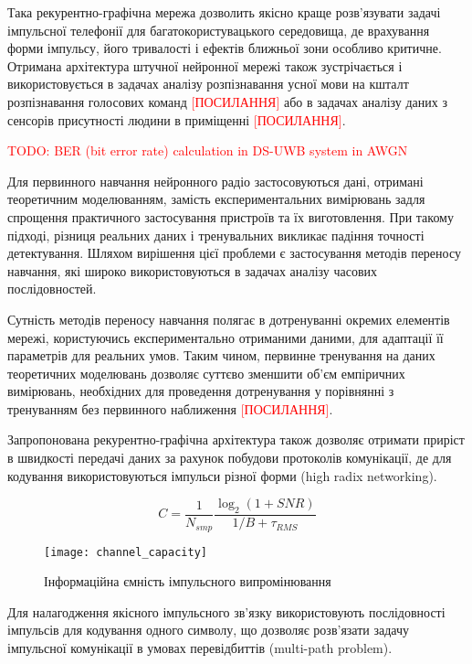 Така рекурентно-графічна мережа дозволить якісно краще розв'язувати задачі 
імпульсної телефонії для багатокористувацького середовища, де врахування форми 
імпульсу, його тривалості і ефектів ближньої зони особливо критичне. Отримана 
архітектура штучної нейронної мережі також зустрічається і використовується в 
задачах аналізу розпізнавання усної мови на кшталт розпізнавання голосових 
команд \textcolor{red}{[ПОСИЛАННЯ]} або в задачах аналізу даних з сенсорів
присутності людини в приміщенні \textcolor{red}{[ПОСИЛАННЯ]}. 

\textcolor{red}{TODO: BER (bit error rate) calculation in DS-UWB system in AWGN}

Для первинного навчання нейронного радіо застосовуються дані, отримані 
теоретичним моделюванням, замість експериментальних вимірювань задля спрощення 
практичного застосування пристроїв та їх виготовлення. При такому підході,
різниця реальних даних і тренувальних викликає падіння точності детектування.
Шляхом вирішення цієї проблеми є застосування методів переносу навчання, які 
широко використовуються в задачах аналізу часових послідовностей. 

Сутність методів переносу навчання полягає в дотренуванні окремих елементів 
мережі, користуючись експериментально отриманими даними, для адаптації її 
параметрів для реальних умов. Таким чином, первинне тренування на даних
теоретичних моделювань дозволяє суттєво зменшити об'єм емпіричних вимірювань,
необхідних для проведення дотренування у порівнянні з тренуванням без 
первинного наближення \textcolor{red}{[ПОСИЛАННЯ]}.

Запропонована рекурентно-графічна архітектура також дозволяє отримати приріст 
в швидкості передачі даних за рахунок побудови протоколів комунікації, де для
кодування використовуються імпульси різної форми (high radix networking).

\begin{equation}
C = \frac{1}{N_{smp}} \frac{\log_2 \left( 1 + SNR \right)}{1/B + \tau_{RMS}} 
\end{equation}

\begin{figure}[htbp] \begin{center}
\texttt{[image: channel\_capacity]}
\caption{Інформаційна ємність імпульсного випромінювання} \label{fig:info_cap}
\end{center} \end{figure}

Для налагодження якісного імпульсного зв'язку використовують послідовності 
імпульсів для кодування одного символу, що дозволяє розв'язати задачу 
імпульсної комунікації в умовах перевідбиттів (multi-path problem).

